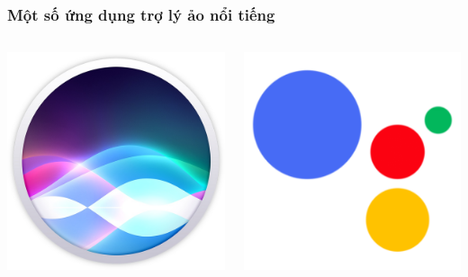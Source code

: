 \documentclass{beamer}
\begin{document}
\begin{frame}
\frametitle{Một số ứng dụng trợ lý ảo nổi tiếng}
\begin{columns}
\begin{minipage}[c][0.4\textheight][c]{\linewidth}
    \centering
    \includegraphics[width=0.8\linewidth]{siri}
\end{minipage}
\begin{minipage}[c][0.4\textheight][c]{\linewidth}
    \centering
    \includegraphics[width=0.8\linewidth]{googleass}
\end{minipage}

\end{columns}
\end{frame}
\end{document}
